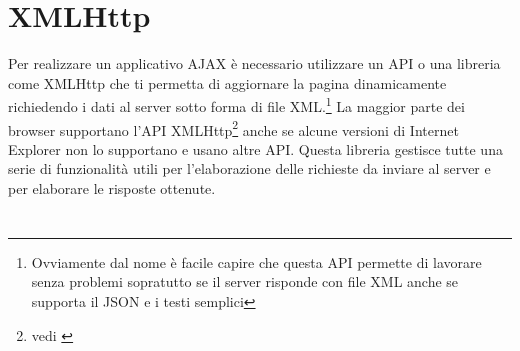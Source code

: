 \documentclass[a4paper,12pt]{report}
\begin{document}
\section{XMLHttp} Per realizzare un applicativo AJAX è necessario utilizzare un API o una libreria come XMLHttp che ti permetta di aggiornare la pagina dinamicamente richiedendo i dati al server sotto forma di file XML.\footnote{Ovviamente dal nome è facile capire che questa API permette di lavorare senza problemi sopratutto se il server risponde con file XML anche se supporta il JSON e i testi semplici} 
La maggior parte dei browser supportano l'API XMLHttp\footnote{vedi \textcites{site:xmlhttpcompatibilita}} anche se alcune versioni di Internet Explorer non lo supportano e usano altre API.
Questa libreria gestisce tutte una serie di funzionalità utili per l'elaborazione delle richieste da inviare al server e per elaborare le risposte ottenute.

\newpage
\section*{\refname}
\printbibliography[heading=web, nottype=book]
\printbibliography[heading=libri, type=book]
\end{document}
